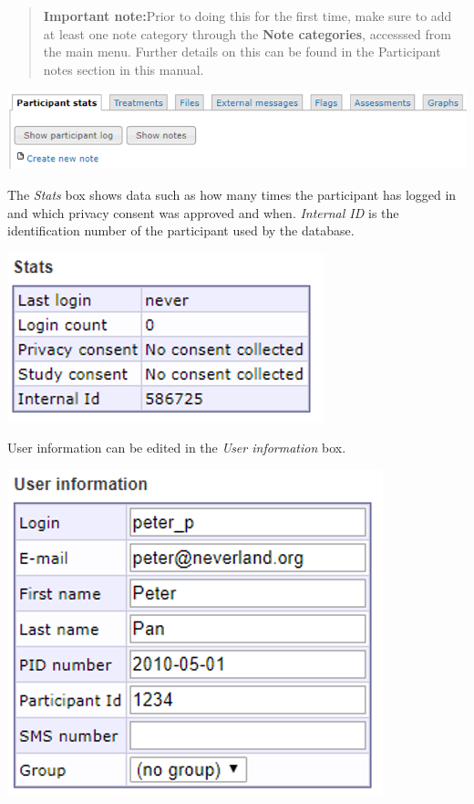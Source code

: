 \documentclass[
]{book}
\begin{document}
\begin{quote}
\textbf{Important note:}Prior to doing this for the first time, make sure to add at least one note category through the \textbf{Note categories}, accesssed from the main menu. Further details on this can be found in the Participant notes section in this manual.
\end{quote}

\includegraphics{images/new-images/participantStatsLogNotes.png}

The \emph{Stats} box shows data such as how many times the participant has logged in and which privacy consent was approved and when. \emph{Internal ID} is the identification number of the participant used by the database.

\includegraphics{images/new-images/participantsStatsSmall.png}

User information can be edited in the \emph{User information} box.

\includegraphics{images/new-images/participantInfo.png}
\end{document}
